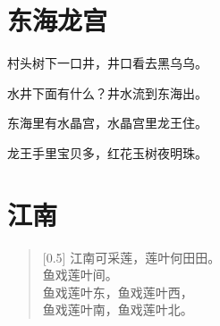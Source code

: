 \documentclass[12pt,UTF-8,openany]{ctexbook}
\begin{document}
\hanzibox{}\hanzibox{}\hanzibox{}\hanzibox{}\hspace{1em}\hanzibox{}\hanzibox{}\hanzibox{}\hanzibox{}






\chapter{东海龙宫}

\begin{large}
    
    村头树下一口井，井口看去黑乌乌。
    
    水井下面有什么？井水流到东海出。
    
    东海里有水晶宫，水晶宫里龙王住。
    
    龙王手里宝贝多，红花玉树夜明珠。
    
\end{large}


\clearpage

\begin{center}
    
\end{center}


\hanzibox{}\hanzibox{}\hanzibox{}\hanzibox{}\hspace{1em}\hanzibox{}\hanzibox{}\hanzibox{}\hanzibox{}

\hanzibox{}\hanzibox{}\hanzibox{}\hanzibox{}\hspace{1em}\hanzibox{}\hanzibox{}\hanzibox{}\hanzibox{}

\hanzibox{}\hanzibox{}\hanzibox{}\hanzibox{}\hspace{1em}\hanzibox{}\hanzibox{}\hanzibox{}\hanzibox{}

\hanzibox{}\hanzibox{}\hanzibox{}\hanzibox{}\hspace{1em}\hanzibox{}\hanzibox{}\hanzibox{}\hanzibox{}






\chapter{江南}

\begin{large}
    
    \begin{verse}[0.5\linewidth]
        江南可采莲，莲叶何田田。 \\
        鱼戏莲叶间。 \\
        鱼戏莲叶东，鱼戏莲叶西， \\
        鱼戏莲叶南，鱼戏莲叶北。
    \end{verse}
    
\end{large}
\end{document}
